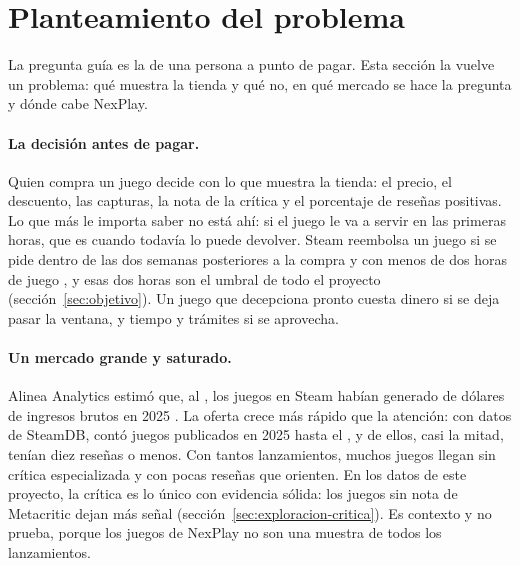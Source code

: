\section{Planteamiento del problema}\label{sec:planteamiento}

La pregunta guía es la de una persona a punto de pagar. Esta sección la vuelve un problema: qué
muestra la tienda y qué no, en qué mercado se hace la pregunta y dónde cabe NexPlay.

\paragraph{La decisión antes de pagar.} Quien compra un juego decide con lo que muestra la tienda:
el precio, el descuento, las capturas, la nota de la crítica y el porcentaje de reseñas positivas.
Lo que más le importa saber no está ahí: si el juego le va a servir en las primeras horas, que es
cuando todavía lo puede devolver. Steam reembolsa un juego si se pide dentro de las dos semanas
posteriores a la compra y con menos de dos horas de juego \parencite{steam_reembolsos}, y esas dos
horas son el umbral de todo el proyecto (sección~\ref{sec:objetivo}). Un juego que decepciona
pronto cuesta dinero si se deja pasar la ventana, y tiempo y trámites si se aprovecha.

\paragraph{Un mercado grande y saturado.} Alinea Analytics estimó que, al
\cifraFechaCorteIngresos{}, los juegos en Steam habían generado \cifraIngresosSteam{} de dólares de
ingresos brutos en 2025 \parencite{elliott2025}. La oferta crece más rápido que la atención: con
datos de SteamDB, \textcite{squireshand2025} contó \cifraLanzamientosSteam{} juegos publicados en
2025 hasta el \cifraFechaCorteLanzamientos{}, y \cifraLanzamientosPocasResenas{} de ellos, casi la
mitad, tenían diez reseñas o menos. Con tantos lanzamientos, muchos juegos llegan sin crítica
especializada y con pocas reseñas que orienten. En los datos de este proyecto, la crítica es lo
único con evidencia sólida: los juegos sin nota de Metacritic dejan más señal
(sección~\ref{sec:exploracion-critica}). Es contexto y no prueba, porque los juegos de NexPlay no
son una muestra de todos los lanzamientos.

